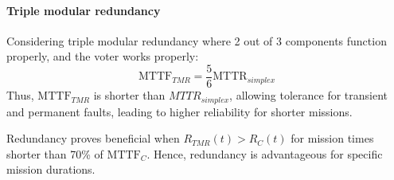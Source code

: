 \paragraph*{Triple modular redundancy}
Considering triple modular redundancy where 2 out of 3 components function properly, and the voter works properly:
\[\text{MTTF}_{TMR}=\dfrac{5}{6}\text{MTTR}_{simplex}\]
Thus, $\text{MTTF}_{TMR}$ is shorter than ${MTTR}_{simplex}$, allowing tolerance for transient and permanent faults, leading to higher reliability for shorter missions.

Redundancy proves beneficial when $R_{TMR}(t)>R_C(t)$ for mission times shorter than 70\% of  $\text{MTTF}_C$.
Hence, redundancy is advantageous for specific mission durations.